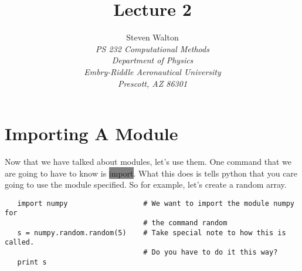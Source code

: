 \documentclass[11pt]{article}   %
\title{Lecture 2}
\author{Steven Walton\\     %
\textit{PS 232 Computational Methods}\\
\textit{Department of Physics}\\
\textit{Embry-Riddle Aeronautical University}\\
\textit{Prescott, AZ   86301}}
\newcommand{\gray}[1]{\colorbox{gray}{#1}}
\begin{document}
\maketitle

\section*{Importing A Module}
Now that we have talked about modules, let's use them. One command that we are going to have to know is \gray{import}.
What this does is tells python that you care going to use the module specified.  So for example, let's create a random array.
\begin{tcolorbox}
   \begin{lstlisting}
   import numpy                  # We want to import the module numpy for 
                                 # the command random
   s = numpy.random.random(5)    # Take special note to how this is called.  
                                 # Do you have to do it this way?
   print s
   \end{lstlisting}
\end{tcolorbox}
\end{document}
